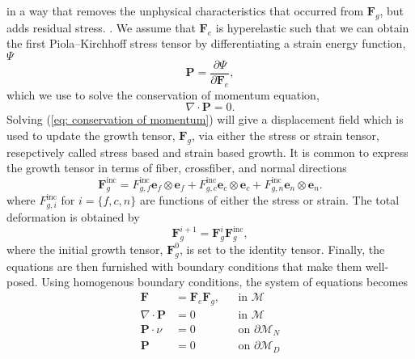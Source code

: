  in a way that removes the unphysical characteristics that occurred from $\mathbf{F}_g$, but adds residual stress. . We assume that $\mathbf{F}_e$ is hyperelastic such that we can obtain the first Piola–Kirchhoff stress tensor by differentiating a strain energy function, $\Psi$
\begin{equation}
\label{eq: stress}
    \mathbf{P} = \frac{\partial\Psi}{\partial \mathbf{F}_e},
\end{equation}
which we use to solve the conservation of momentum equation,
\begin{equation}
\label{eq: conservation of momentum}
    \nabla\cdot\mathbf{P} = 0.
\end{equation}
Solving (\ref{eq: conservation of momentum}) will give a displacement field which is used to update the growth tensor, $\mathbf{F}_g$, via either the stress or strain tensor, resepctively called stress based and strain based growth. It is common to express the growth tensor in terms of fiber, crossfiber, and normal directions 
\begin{equation*}
    \mathbf{F}_g^\mathrm{inc} = F^\mathrm{inc}_{g,f}\mathbf{e}_f\otimes \mathbf{e}_f + F^\mathrm{inc}_{g,c}\mathbf{e}_c\otimes \mathbf{e}_c + F^\mathrm{inc}_{g,n}\mathbf{e}_n\otimes \mathbf{e}_n.
\end{equation*}
where $F^\mathrm{inc}_{g, i}$ for  $i = \{f, c, n\}$ are functions of either the stress or strain. The total deformation is obtained by 
\begin{equation*}
    \mathbf{F}_g^{i + 1} = \mathbf{F}_g^i\mathbf{F}_g^\mathrm{inc},
\end{equation*}
where the initial growth tensor, $\mathbf{F}_g^0$, is set to the identity tensor. Finally, the equations are then furnished with boundary conditions that make them well-posed. Using homogenous boundary conditions, the system of equations becomes
\begin{equation} \label{eq: system of equations}
\begin{aligned}
    \mathbf{F} & = \mathbf{F}_e\mathbf{F}_g, && \text{in } \mathcal{M}\\
    \nabla\cdot\mathbf{P} & = 0 && \text{in } \mathcal{M} \\
    \mathbf{P}\cdot \nu & = 0 && \text{on } \partial\mathcal{M}_N \\
    \mathbf{P} & = 0 && \text{on } \partial\mathcal{M}_D
\end{aligned}
\end{equation} 
